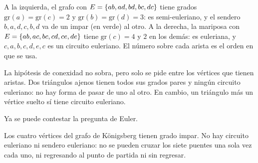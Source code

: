 \documentclass[11pt,letterpaper]{article}
\begin{document}
\begin{ejemplo}[Diapositivas 115 y 119]
  \label{ej:euler-teoria}
  A la izquierda, el grafo con $E = \left\{ ab, ad, bd, bc, dc \right\}$ tiene
  grados $\text{gr}(a) = \text{gr}(c) = 2$ y
  $\text{gr}(b) = \text{gr}(d) = 3$: es semi-euleriano, y el sendero
  $b, a, d, c, b, d$ va de un impar (en verde) al otro. A la derecha,
  la mariposa con $E = \left\{ ab, ac, bc, cd, ce, de \right\}$ tiene
  $\text{gr}(c) = 4$ y $2$ en los demás: es euleriana, y
  $c, a, b, c, d, e, c$ es un circuito euleriano. El número sobre cada
  arista es el orden en que se usa.
  \begin{center}
  \end{center}
\end{ejemplo}

\begin{ojo}
  La hipótesis de conexidad no sobra, pero solo se pide entre los
  vértices que tienen aristas. Dos triángulos ajenos tienen todos sus
  grados pares y ningún circuito euleriano: no hay forma de pasar de
  uno al otro. En cambio, un triángulo más un vértice suelto sí tiene
  circuito euleriano.
\end{ojo}

Ya se puede contestar la pregunta de Euler.

\begin{resultado}
  Los cuatro vértices del grafo de Königsberg tienen grado impar. No
  hay circuito euleriano ni sendero euleriano: no se pueden cruzar los
  siete puentes una sola vez cada uno, ni regresando al punto de
  partida ni sin regresar.
\end{resultado}
\end{document}
